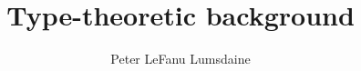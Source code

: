 \documentclass{amsart}
\begin{document}

\title{Type-theoretic background}

\author[P. LeF. Lumsdaine]{Peter LeFanu Lumsdaine}

\maketitle
\tableofcontents
















\end{document}
